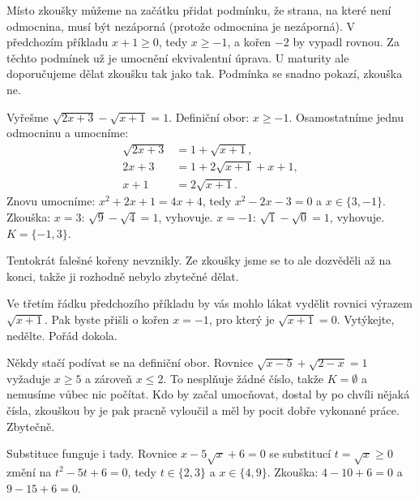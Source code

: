 \begin{note}
  Místo zkoušky můžeme na začátku přidat podmínku, že strana, na které není odmocnina, musí být nezáporná (protože odmocnina je nezáporná). V předchozím příkladu $x + 1\geq 0$, tedy $x\geq -1$, a kořen $-2$ by vypadl rovnou. Za těchto podmínek už je umocnění ekvivalentní úprava. U maturity ale doporučujeme dělat zkoušku tak jako tak. Podmínka se snadno pokazí, zkouška ne.
\end{note}

\begin{example}
  Vyřešme $\sqrt{2x + 3} - \sqrt{x + 1} = 1$. Definiční obor: $x\geq -1$. Osamostatníme jednu odmocninu a umocníme:
  \begin{align*}
    \sqrt{2x + 3} &= 1 + \sqrt{x + 1},\\
    2x + 3 &= 1 + 2\sqrt{x + 1} + x + 1,\\
    x + 1 &= 2\sqrt{x + 1}.
  \end{align*}
  Znovu umocníme: $x^2 + 2x + 1 = 4x + 4$, tedy $x^2 - 2x - 3 = 0$ a $x\in\{3, -1\}$. Zkouška: $x = 3$: $\sqrt{9} - \sqrt{4} = 1$, vyhovuje. $x = -1$: $\sqrt{1} - \sqrt{0} = 1$, vyhovuje. $K = \{-1, 3\}$.

  Tentokrát falešné kořeny nevznikly. Ze zkoušky jsme se to ale dozvěděli až na konci, takže ji rozhodně nebylo zbytečné dělat.
\end{example}

\begin{note}
  Ve třetím řádku předchozího příkladu by vás mohlo lákat vydělit rovnici výrazem $\sqrt{x + 1}$. Pak byste přišli o kořen $x = -1$, pro který je $\sqrt{x + 1} = 0$. Vytýkejte, nedělte. Pořád dokola.
\end{note}

\begin{example}
  Někdy stačí podívat se na definiční obor. Rovnice $\sqrt{x - 5} + \sqrt{2 - x} = 1$ vyžaduje $x\geq 5$ a zároveň $x\leq 2$. To nesplňuje žádné číslo, takže $K = \emptyset$ a nemusíme vůbec nic počítat. Kdo by začal umocňovat, dostal by po chvíli nějaká čísla, zkouškou by je pak pracně vyloučil a měl by pocit dobře vykonané práce. Zbytečně.
\end{example}

\begin{example}
  Substituce funguje i tady. Rovnice $x - 5\sqrt{x} + 6 = 0$ se substitucí $t = \sqrt{x}\geq 0$ změní na $t^2 - 5t + 6 = 0$, tedy $t\in\{2, 3\}$ a $x\in\{4, 9\}$. Zkouška: $4 - 10 + 6 = 0$ a $9 - 15 + 6 = 0$.
\end{example}

